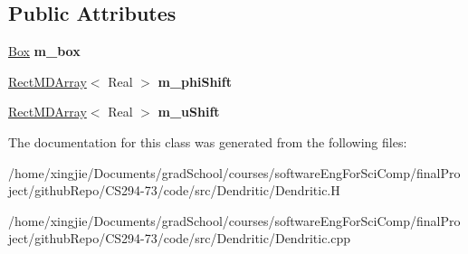 \subsection*{Public Attributes}
\begin{DoxyCompactItemize}
\item 
\hypertarget{classDendriticShift_a08c611e07c85d23f1822f03775a217f5}{}\hyperlink{classBox}{Box} {\bfseries m\+\_\+box}\label{classDendriticShift_a08c611e07c85d23f1822f03775a217f5}

\item 
\hypertarget{classDendriticShift_acad8e4fc5c384d7bce09f9c998d4643e}{}\hyperlink{classRectMDArray}{Rect\+M\+D\+Array}$<$ Real $>$ {\bfseries m\+\_\+phi\+Shift}\label{classDendriticShift_acad8e4fc5c384d7bce09f9c998d4643e}

\item 
\hypertarget{classDendriticShift_a710068a8ab51f0830cc6f7f304a97509}{}\hyperlink{classRectMDArray}{Rect\+M\+D\+Array}$<$ Real $>$ {\bfseries m\+\_\+u\+Shift}\label{classDendriticShift_a710068a8ab51f0830cc6f7f304a97509}

\end{DoxyCompactItemize}


The documentation for this class was generated from the following files\+:\begin{DoxyCompactItemize}
\item 
/home/xingjie/\+Documents/grad\+School/courses/software\+Eng\+For\+Sci\+Comp/final\+Project/github\+Repo/\+C\+S294-\/73/code/src/\+Dendritic/Dendritic.\+H\item 
/home/xingjie/\+Documents/grad\+School/courses/software\+Eng\+For\+Sci\+Comp/final\+Project/github\+Repo/\+C\+S294-\/73/code/src/\+Dendritic/Dendritic.\+cpp\end{DoxyCompactItemize}
